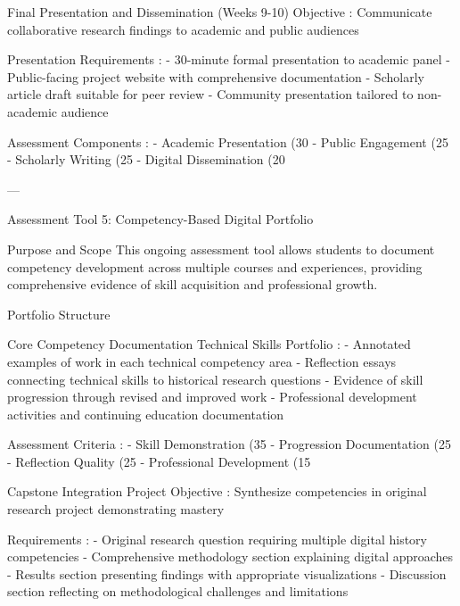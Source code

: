 \begin{appendices}
     Final Presentation and Dissemination (Weeks 9-10)
 Objective : Communicate collaborative research findings to academic and public audiences

 Presentation Requirements :
- 30-minute formal presentation to academic panel
- Public-facing project website with comprehensive documentation
- Scholarly article draft suitable for peer review
- Community presentation tailored to non-academic audience

 Assessment Components :
-  Academic Presentation  (30%
-  Public Engagement  (25%
-  Scholarly Writing  (25%
-  Digital Dissemination  (20%

---

   Assessment Tool 5: Competency-Based Digital Portfolio

    Purpose and Scope
This ongoing assessment tool allows students to document competency development across multiple courses and experiences, providing comprehensive evidence of skill acquisition and professional growth.

    Portfolio Structure

     Core Competency Documentation
 Technical Skills Portfolio :
- Annotated examples of work in each technical competency area
- Reflection essays connecting technical skills to historical research questions
- Evidence of skill progression through revised and improved work
- Professional development activities and continuing education documentation

 Assessment Criteria :
-  Skill Demonstration  (35%
-  Progression Documentation  (25%
-  Reflection Quality  (25%
-  Professional Development  (15%

     Capstone Integration Project
 Objective : Synthesize competencies in original research project demonstrating mastery

 Requirements :
- Original research question requiring multiple digital history competencies
- Comprehensive methodology section explaining digital approaches
- Results section presenting findings with appropriate visualizations
- Discussion section reflecting on methodological challenges and limitations


\end{appendices}
